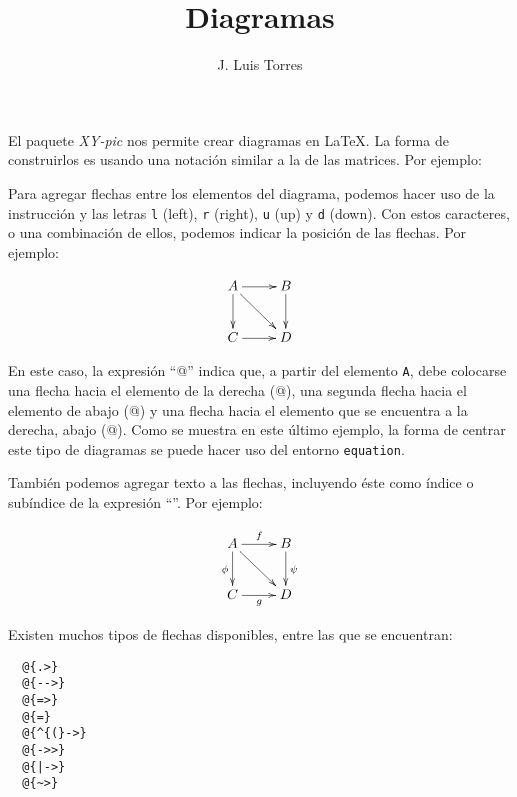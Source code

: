 \documentclass[letterpaper,12pt]{article}
\title{Diagramas}
\author{J. Luis Torres}
\begin{document}
\maketitle

El paquete \textit{XY-pic} nos permite crear diagramas en \LaTeX. La forma de construirlos es usando una notación similar a la de las matrices. Por ejemplo:

\bigskip

    
\bigskip

Para agregar flechas entre los elementos del diagrama, podemos hacer uso de la instrucción \verb@\ar@ y las letras \texttt{l} (left), \texttt{r} (right), \texttt{u} (up) y \texttt{d} (down). Con estos caracteres, o una combinación de ellos, podemos indicar la posición de las flechas. Por ejemplo:

\bigskip

\begin{equation*}
\xymatrix{
    A \ar[r] \ar[d] \ar[rd] & B \ar[d] \\
    C \ar[r] & D
}
\end{equation*}

\bigskip

En este caso, la expresión ``\verb@A \ar[r] \ar[d] \ar[rd]@'' indica que, a partir del elemento \texttt{A}, debe colocarse una flecha hacia el elemento de la derecha (\verb@\ar[r]@), una segunda flecha hacia el elemento de abajo (\verb@\ar[r]@) y una flecha hacia el elemento que se encuentra a la derecha, abajo (\verb@\ar[rd]@). Como se muestra en este último ejemplo, la forma de centrar este tipo de diagramas se puede hacer uso del entorno \texttt{equation}.

También podemos agregar texto a las flechas, incluyendo éste como índice o subíndice de la expresión ``\verb@\ar@''. Por ejemplo:

\bigskip

\begin{equation*}
\xymatrix{
    A \ar[r]^f \ar[d]_\phi \ar[rd] & B \ar[d]^\psi \\
    C \ar[r]_g & D
}
\end{equation*}

\bigskip

Existen muchos tipos de flechas disponibles, entre las que se encuentran:

\begin{verbatim}
  @{.>}
  @{-->}
  @{=>}
  @{=}
  @{^{(}->}
  @{->>}
  @{|->}
  @{~>}
\end{verbatim}    
\end{document}
